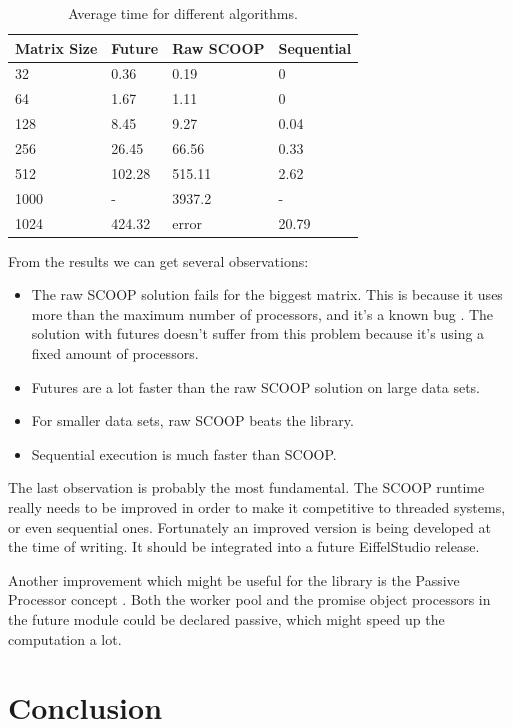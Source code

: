 \documentclass[a4paper,10pt]{article}
\begin{document}
\begin{table} [!h]
\centering
\begin{tabular}{|l|l l l|} 
\hline
Matrix Size & Future & Raw SCOOP & Sequential\\
\hline
32 & 0.36 & 0.19 & 0\\
64 & 1.67 & 1.11 & 0\\
128 & 8.45 & 9.27 & 0.04\\
256 & 26.45 & 66.56 & 0.33\\
512 & 102.28 & 515.11 & 2.62\\
1000 & - &  3937.2 & - \\
1024 & 424.32 & error & 20.79 \\
\hline
\end{tabular}
\caption{Average time for different algorithms.}
\label{table:perf-results}
\end{table}


From the results we can get several observations:

\begin{itemize}
 \item The raw SCOOP solution fails for the biggest matrix. 
 This is because it uses more than the maximum number of processors, and it's a known bug \cite{web:scoop-issues}.
 The solution with futures doesn't suffer from this problem because it's using a fixed amount of processors.
 \item Futures are a lot faster than the raw SCOOP solution on large data sets.
 \item For smaller data sets, raw SCOOP beats the library.
 \item Sequential execution is much faster than SCOOP.
\end{itemize}

The last observation is probably the most fundamental.
The SCOOP runtime really needs to be improved in order to make it competitive to threaded systems, or even sequential ones.
Fortunately an improved version \cite{thesis:scottwest} is being developed at the time of writing.
It should be integrated into a future EiffelStudio release.

Another improvement which might be useful for the library is the Passive Processor concept \cite{paper:passive-processors}.
Both the worker pool and the promise object processors in the future module could be declared passive, which might speed up the computation a lot.

\section{Conclusion}
\end{document}
